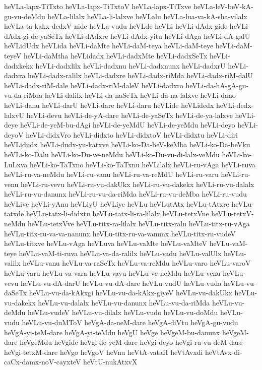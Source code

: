 {heVLa-lapx-TiTxto
heVLa-lapx-TiTxtoV
heVLa-lapx-TiTxve
heVLa-leV-beV-kA-gu-vu-deMdu
heVLa-lilalx
heVLa-li-lalxve
heVLalu
heVLa-lua-va-kA-sha-vilalx
heVLa-ta-kakx-dedxV-nide
heVLa-vudu
heVLde
heVLi
heVLi-dAdx-gide
heVLi-dAdx-gi-de-yaSeTx
heVLi-dAdxre
heVLi-dAdx-yitu
heVLi-dAga
heVLi-dA-galU
heVLidUdx
heVLida
heVLi-daMte
heVLi-daM-teya
heVLi-daM-teye
heVLi-daM-teyeV
heVLi-daMtha
heVLidadx
heVLi-dadxMte
heVLi-dadxSeTx
heVLi-dadxkekx
heVLi-dadxlilx
heVLi-dadxnu
heVLi-dadxnunx
heVLi-dadxrU
heVLi-dadxra
heVLi-dadx-ralilx
heVLi-dadxre
heVLi-dadx-riMda
heVLi-dadx-riM-dalU
heVLi-dadx-riM-dale
heVLi-dadx-riM-daleV
heVLi-dadxro
heVLi-da-hA-gA-gu-vu-da-riMda
heVLi-dalilx
heVLi-da-naSeTx
heVLi-da-na-lalxve
heVLi-dano
heVLi-danu
heVLi-darU
heVLi-dare
heVLi-daru
heVLide
heVLidedx
heVLi-dedx-lalxvU
heVLi-devu
heVLi-de-yA-dare
heVLi-de-yaSeTx
heVLi-de-ya-lalxve
heVLi-deye
heVLi-de-yeM-bu-dAgi
heVLi-de-yeMdU
heVLi-de-yeMdu
heVLi-deyo
heVLi-deyoV
heVLi-didxVro
heVLi-didxto
heVLi-didxtoV
heVLi-didxtu
heVLi-diri
heVLidudx
heVLi-dudx-yu-katxve
heVLi-ko-Da-beV-keMba
heVLi-ko-Da-beVku
heVLi-ko-Dalu
heVLi-ko-Du-ve-neMdu
heVLi-ko-Du-vu-di-lalx-veMdu
heVLi-ko-LuLxva
heVLi-ko-TaTxno
heVLi-ko-TaTxnu
heVLilalx
heVLi-ru-vAga
heVLi-ruva
heVLi-ru-va-neMdu
heVLi-ru-vanu
heVLi-ru-va-reMdU
heVLi-ru-varu
heVLi-ru-venu
heVLi-ru-vevu
heVLi-ru-vu-dakUkx
heVLi-ru-vu-dakekx
heVLi-ru-vu-dalalx
heVLi-ru-vu-danunx
heVLi-ru-vu-da-riMda
heVLi-ru-vu-deMba
heVLi-ru-vudu
heVLive
heVLi-yAnu
heVLiyU
heVLiye
heVLu
heVLutAtx
heVLu-tAtxre
heVLu-tatxde
heVLu-tatx-li-didxtu
heVLu-tatx-li-ra-lilalx
heVLu-tetxVne
heVLu-tetxV-neMdu
heVLu-tetxVve
heVLu-titx-ra-lilalx
heVLu-titx-ralu
heVLu-titx-ru-vAga
heVLu-titx-ru-va-va-nanunx
heVLu-titx-ru-va-vanunx
heVLu-titx-ru-vudeV
heVLu-titxve
heVLu-vAga
heVLuva
heVLu-vaMte
heVLu-vaMteV
heVLu-vaM-teye
heVLu-vaM-ti-ruva
heVLu-va-da-ralilx
heVLu-vadu
heVLu-valUlx
heVLu-valilx
heVLu-vanu
heVLu-va-raSeTx
heVLu-va-reMdu
heVLu-varo
heVLu-varoV
heVLu-varu
heVLu-va-vara
heVLu-vavu
heVLu-ve-neMdu
heVLu-venu
heVLu-vevu
heVLu-vu-dA-darU
heVLu-vu-dA-dare
heVLu-vudU
heVLu-vuda
heVLu-vu-daSeTx
heVLu-vu-da-kAkxgi
heVLu-vu-da-kAkx-giyeV
heVLu-vu-dakUkx
heVLu-vu-dakekx
heVLu-vu-dalalx
heVLu-vu-danunx
heVLu-vu-da-riMda
heVLu-vu-deMdu
heVLu-vudeV
heVLu-vu-dilalx
heVLu-vudo
heVLu-vu-doMdu
heVLu-vudu
heVLu-vu-duMToV
heVgA-da-neM-dare
heVgA-diVtu
heVgA-gu-vudu
heVgA-yi-teM-dare
heVgA-yi-teMdu
heVgU
heVge
heVgeM-bu-danunx
heVgeM-dare
heVgeMdu
heVgide
heVgi-de-yeM-dare
heVgi-deyo
heVgi-ru-vu-deM-dare
heVgi-tetxM-dare
heVgo
heVgoV
heVnu
heVtA-vataH
heVtAvxdi
heVtAvx-di-caCx-damx-noV-cayxteV
heVtU-nukAtxvX
}
